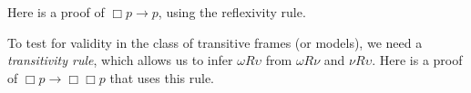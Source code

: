 Here is a proof of $\Box p \to p$, using the reflexivity rule.

\begin{center}
\end{center}

To test for validity in the class of transitive frames (or models), we need a
\emph{transitivity rule}, which allows us to infer $\omega R\upsilon$ from
$\omega R\nu$ and $\nu R\upsilon$. Here is a proof of $\Box p \to \Box\Box p$
that uses this rule.

\begin{center}
\end{center}

